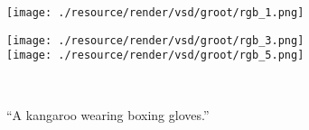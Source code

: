 \begin{figure*}[t!]
\begin{minipage}[c]{1\linewidth}
{\begin{minipage}[c]{0.13\linewidth}
                \texttt{[image: ./resource/render/vsd/groot/rgb\_1.png]}
            \end{minipage}
            \hspace{-1.8mm}
            \begin{minipage}[c]{0.065\linewidth}
                \texttt{[image: ./resource/render/vsd/groot/rgb\_3.png]}\\
                \vspace{-4.2mm}
                \texttt{[image: ./resource/render/vsd/groot/rgb\_5.png]}
            \end{minipage}
        }
        \hspace{-2mm}
    \end{minipage}
    \\

    \vspace{1mm}
    \begin{minipage}[c]{1\linewidth}
        \parbox{1\linewidth}{\centering ``A kangaroo wearing boxing gloves.''}
        \vspace{-7mm}


\end{minipage}
\end{figure*}
